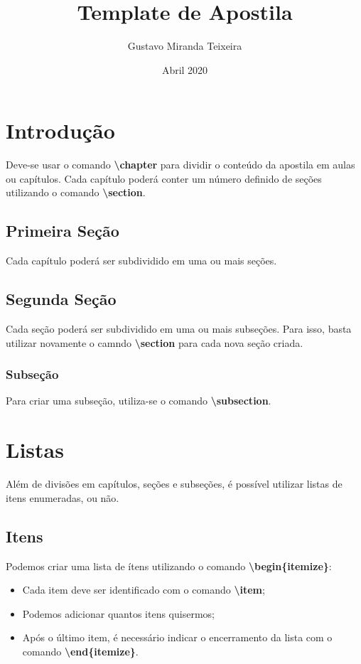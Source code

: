 \documentclass{apostila}
\title{Template de Apostila}
\author{Gustavo Miranda Teixeira}
\date{Abril 2020}
\begin{document}
\maketitle

\chapter{Introdução}

Deve-se usar o comando \textbf{\textbackslash chapter} para dividir o conteúdo da apostila em aulas ou capítulos. Cada capítulo poderá conter um número definido de seções utilizando o comando \textbf{\textbackslash section}.

\section{Primeira Seção}
Cada capítulo poderá ser subdividido em uma ou mais seções.

\section{Segunda Seção}
Cada seção poderá ser subdividido em uma ou mais subseções. Para isso, basta utilizar novamente o camndo \textbf{\textbackslash section} para cada nova seção criada.

\subsection{Subseção}
Para criar uma subseção, utiliza-se o comando \textbf{\textbackslash subsection}.

\chapter{Listas}
Além de divisões em capítulos, seções e subseções, é possível utilizar listas de itens enumeradas, ou não.

\section{Itens}

Podemos criar uma lista de ítens utilizando o comando \textbf{\textbackslash begin\{itemize\}}:
\begin{itemize}
 \item Cada item deve ser identificado com o comando \textbf{\textbackslash item};
 \item Podemos adicionar quantos itens quisermos;
 \item Após o último item, é necessário indicar o encerramento da lista com o comando \textbf{\textbackslash end\{itemize\}}.
\end{itemize}
\end{document}
